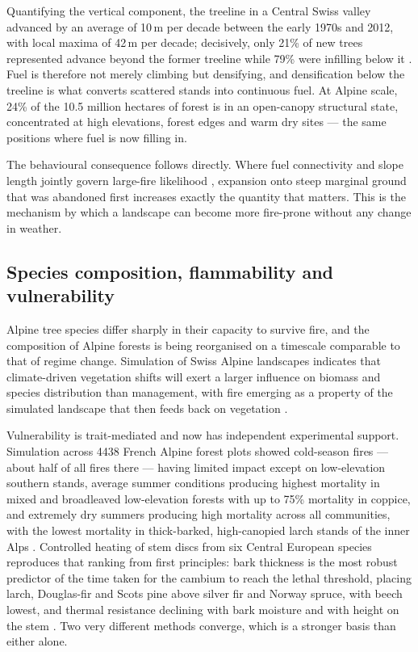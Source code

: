 \documentclass[11pt,a4paper]{article}
\begin{document}
Quantifying the vertical component, the treeline in a Central Swiss valley advanced by an average of 10\,m per decade between the early 1970s and 2012, with local maxima of 42\,m per decade; decisively, only 21\% of new trees represented advance beyond the former treeline while 79\% were infilling below it \citep{frei_evidence_2023}. Fuel is therefore not merely climbing but densifying, and densification below the treeline is what converts scattered stands into continuous fuel. At Alpine scale, 24\% of the 10.5 million hectares of forest is in an open-canopy structural state, concentrated at high elevations, forest edges and warm dry sites \citep{stritih_alternative_2023} --- the same positions where fuel is now filling in.

The behavioural consequence follows directly. Where fuel connectivity and slope length jointly govern large-fire likelihood \citep{conedera_linking_2024}, expansion onto steep marginal ground that was abandoned first increases exactly the quantity that matters. This is the mechanism by which a landscape can become more fire-prone without any change in weather.

\subsection{Species composition, flammability and vulnerability}

Alpine tree species differ sharply in their capacity to survive fire, and the composition of Alpine forests is being reorganised on a timescale comparable to that of regime change. Simulation of Swiss Alpine landscapes indicates that climate-driven vegetation shifts will exert a larger influence on biomass and species distribution than management, with fire emerging as a property of the simulated landscape that then feeds back on vegetation \citep{schumacher_relative_2006}.

Vulnerability is trait-mediated and now has independent experimental support. Simulation across 4438 French Alpine forest plots showed cold-season fires --- about half of all fires there --- having limited impact except on low-elevation southern stands, average summer conditions producing highest mortality in mixed and broadleaved low-elevation forests with up to 75\% mortality in coppice, and extremely dry summers producing high mortality across all communities, with the lowest mortality in thick-barked, high-canopied larch stands of the inner Alps \citep{dupire_vulnerability_2019}. Controlled heating of stem discs from six Central European species reproduces that ranking from first principles: bark thickness is the most robust predictor of the time taken for the cambium to reach the lethal threshold, placing larch, Douglas-fir and Scots pine above silver fir and Norway spruce, with beech lowest, and thermal resistance declining with bark moisture and with height on the stem \citep{mutterer_bark_2026}. Two very different methods converge, which is a stronger basis than either alone.
\end{document}
